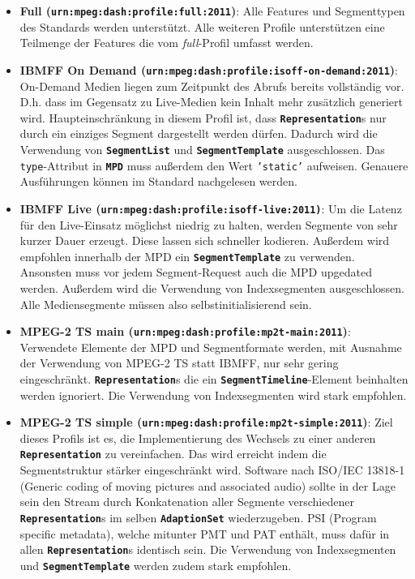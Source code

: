 \documentclass[paper = a4, fontsize = 12pt, parskip = half]{scrartcl} %
\def\attr#1{\texttt{#1}}
\def\elem#1{\texttt{\textbf{#1}}}
\begin{document}
\begin{itemize}
	\item \textbf{Full (\attr{urn:mpeg:dash:profile:full:2011})}: Alle Features und Segmenttypen des Standards werden unterstützt. Alle weiteren Profile unterstützen eine Teilmenge der Features die vom \textit{full}-Profil umfasst werden.
	\item \textbf{IBMFF On Demand (\attr{urn:mpeg:dash:profile:isoff-on-demand:2011})}: On-Demand Medien liegen zum Zeitpunkt des Abrufs bereits vollständig vor. D.h. dass im Gegensatz zu Live-Medien kein Inhalt mehr zusätzlich generiert wird. Haupteinschränkung in diesem Profil ist, dass \elem{Representation}s nur durch ein einziges Segment dargestellt werden dürfen. Dadurch wird die Verwendung von \elem{SegmentList} und \elem{SegmentTemplate} ausgeschlossen. Das \attr{type}-Attribut in \elem{MPD} muss außerdem den Wert \attr{'static'} aufweisen. Genauere Ausführungen können im Standard nachgelesen werden.
	\item \textbf{IBMFF Live (\attr{urn:mpeg:dash:profile:isoff-live:2011)}}: Um die Latenz für den Live-Einsatz möglichst niedrig zu halten, werden Segmente von sehr kurzer Dauer erzeugt. Diese lassen sich schneller kodieren. Außerdem wird empfohlen innerhalb der MPD ein \elem{SegmentTemplate} zu verwenden. Ansonsten muss vor jedem Segment-Request auch die MPD upgedated werden. Außerdem wird die Verwendung von Indexsegmenten ausgeschlossen. Alle Mediensegmente müssen also selbstinitialisierend sein.
	\item \textbf{MPEG-2 TS main (\attr{urn:mpeg:dash:profile:mp2t-main:2011})}: Verwendete Elemente der MPD und Segmentformate werden, mit Ausnahme der Verwendung von MPEG-2 TS statt IBMFF, nur sehr gering eingeschränkt. \elem{Representation}s die ein \elem{SegmentTimeline}-Element beinhalten werden ignoriert. Die Verwendung von Indexsegmenten wird stark empfohlen.
	\item \textbf{MPEG-2 TS simple (\attr{urn:mpeg:dash:profile:mp2t-simple:2011})}: Ziel dieses Profils ist es, die Implementierung des Wechsels zu einer anderen \elem{Representation} zu vereinfachen. Das wird erreicht indem die Segmentstruktur stärker eingeschränkt wird. Software nach ISO/IEC 13818-1 (Generic coding of moving pictures and associated audio) sollte in der Lage sein den Stream durch Konkatenation aller Segmente verschiedener \elem{Representation}s im selben \elem{AdaptionSet} wiederzugeben. PSI (Program specific metadata), welche mitunter PMT und PAT enthält, muss dafür in allen \elem{Representation}s identisch sein. Die Verwendung von Indexsegmenten und \elem{SegmentTemplate} werden zudem stark empfohlen.
\end{itemize}
 
\end{document}
